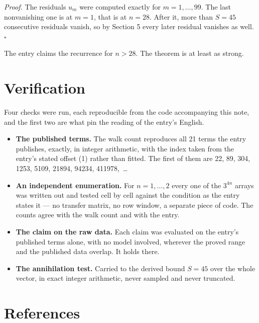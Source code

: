 \documentclass[11pt]{article}
\theoremstyle{definition}
\begin{document}
{\itshape Proof.} The residuals $u_m$ were computed exactly for $m = 1,\dots,99$. The last nonvanishing one is at $m = 1$, that is at $n = 28$. After it, more than $S = 45$ consecutive residuals vanish, so by Section 5 every later residual vanishes as well. $\square$

The entry claims the recurrence for $n > 28$. The theorem is at least as strong.

\section{Verification}

Four checks were run, each reproducible from the code accompanying this note, and the first two are what pin the reading of the entry's English.

\begin{itemize}

\item {\bfseries The published terms.} The walk count reproduces all 21 terms the entry publishes, exactly, in integer arithmetic, with the index taken from the entry's stated offset (1) rather than fitted. The first of them are 22, 89, 304, 1253, 5109, 21894, 94234, 411978,~\dots

\item {\bfseries An independent enumeration.} For $n = 1,\dots,2$ every one of the $3^{4n}$ arrays was written out and tested cell by cell against the condition as the entry states it --- no transfer matrix, no row window, a separate piece of code. The counts agree with the walk count and with the entry.

\item {\bfseries The claim on the raw data.} Each claim was evaluated on the entry's published terms alone, with no model involved, wherever the proved range and the published data overlap. It holds there.

\item {\bfseries The annihilation test.} Carried to the derived bound $S = 45$ over the whole vector, in exact integer arithmetic, never sampled and never truncated.

\end{itemize}

\section{References}
\end{document}
